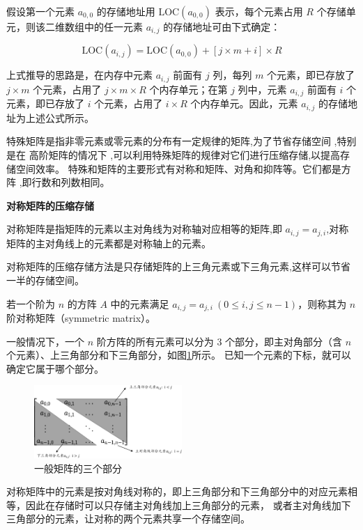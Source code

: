 \documentclass[lang=cn,newtx,10pt,scheme=chinese]{../elegantbook}
\begin{document}
假设第一个元素 $a_{0,0}$ 的存储地址用 $\text{LOC}(a_{0,0})$ 表示，每个元素占用 $R$ 个存储单元，则该二维数组中的任一元素 $a_{i,j}$ 的存储地址可由下式确定：

\begin{equation}
\text{LOC}(a_{i,j}) = \text{LOC}(a_{0,0}) + [j \times m + i] \times R
\end{equation}

上式推导的思路是，在内存中元素 $a_{i,j}$ 前面有 $j$ 列，每列 $m$ 个元素，即已存放了 $j \times m$ 个元素，占用了 $j \times m \times R$ 个内存单元；在第 $j$ 列中，元素 $a_{i,j}$ 前面有 $i$ 个元素，即已存放了 $i$ 个元素，占用了 $i \times R$ 个内存单元。因此，元素 $a_{i,j}$ 的存储地址为上述公式所示。

特殊矩阵是指非零元素或零元素的分布有一定规律的矩阵,为了节省存储空间 ,特别是在
高阶矩阵的情况下 ,可以利用特殊矩阵的规律对它们进行压缩存储,以提高存储空间效率。
特殊和矩阵的主要形式有对称和矩阵、对角和抑阵等。它们都是方阵 ,即行数和列数相同。

\textbf{对称矩阵的压缩存储}

对称矩阵是指矩阵的元素以主对角线为对称轴对应相等的矩阵,即 $a_{i,j} = a_{j,i}$,对称矩阵的主对角线上的元素都是对称轴上的元素。

对称矩阵的压缩存储方法是只存储矩阵的上三角元素或下三角元素,这样可以节省一半的存储空间。


若一个阶为 $n$ 的方阵 $A$ 中的元素满足 $a_{i,j} = a_{j,i} \ (0 \leq i, j \leq n-1)$，则称其为 $n$ 阶对称矩阵（symmetric matrix）。

一般情况下，一个 $n$ 阶方阵的所有元素可以分为 3 个部分，即主对角部分（含 $n$ 个元素）、上三角部分和下三角部分，如图\ref{fig:common_matrix}所示。
已知一个元素的下标，就可以确定它属于哪个部分。

\begin{figure}[!htbp]
  \centering
  \includegraphics[width=0.5\textwidth]{./figure/pdf/cropped/commonMatrix.pdf}
  \caption{一般矩阵的三个部分}
  \label{fig:common_matrix}
\end{figure}

对称矩阵中的元素是按对角线对称的，即上三角部分和下三角部分中的对应元素相等，因此在存储时可以只存储主对角线加上三角部分的元素，
或者主对角线加下三角部分的元素，让对称的两个元素共享一个存储空间。
\end{document}

